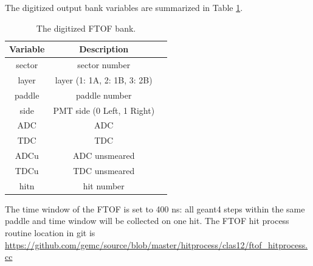 The digitized output bank variables are summarized in Table \ref{tab:ftofBank}.

\begin{table}[h]
	\begin{center}
		\begin{tabular}{| c | c | c |}
			\hline \hline
			Variable  & Description                                 \\
			\hline
              sector  &                             sector number   \\
               layer  &               layer (1: 1A, 2: 1B, 3: 2B)   \\
              paddle  &                             paddle number   \\
                side  &                PMT side (0 Left, 1 Right)   \\
                 ADC  &                                       ADC   \\
                 TDC  &                                       TDC   \\
                ADCu  &                             ADC unsmeared   \\
                TDCu  &                             TDC unsmeared   \\
                hitn  &                                hit number   \\
			\hline \hline
		\end{tabular}
	\end{center}
	\caption{The digitized FTOF bank.}\label{tab:ftofBank}
\end{table}


The time window  of the FTOF is set to 400 ns: all geant4 steps within the same paddle and time window will be collected on one hit.
The FTOF hit process routine location in git is \url{https://github.com/gemc/source/blob/master/hitprocess/clas12/ftof_hitprocess.cc}


